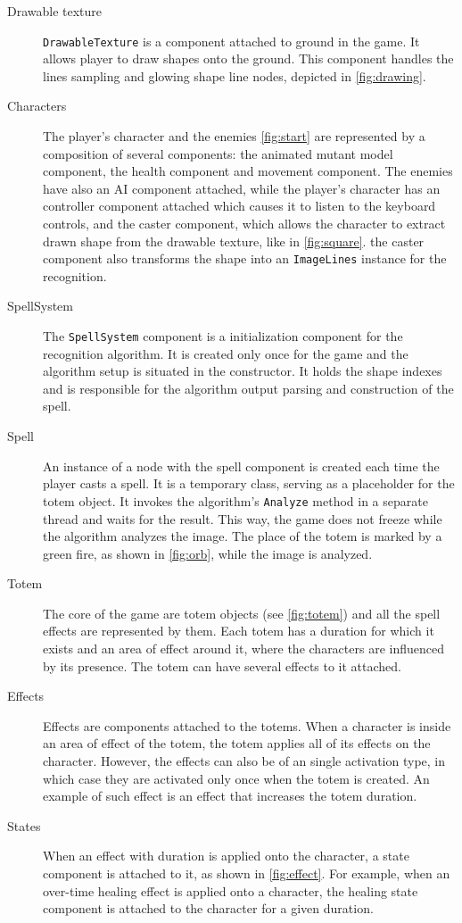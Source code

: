 \begin{description}
\item [Drawable texture] \texttt{DrawableTexture} is a component attached to ground in the game. It allows player to draw shapes onto the ground. This component handles the lines sampling and glowing shape line nodes, depicted in \cref{fig:drawing}.

\item [Characters] The player's character and the enemies \ref{fig:start} are represented by a composition of several components: the animated mutant model component, the health component and movement component. The enemies have also an AI component attached, while the player's character has an controller component attached which causes it to listen to the keyboard controls, and the caster component, which allows the character to extract drawn shape from the drawable texture, like in \cref{fig:square}. the caster component also transforms the shape into an \texttt{ImageLines} instance for the recognition.

\item [SpellSystem] The \texttt{SpellSystem} component is a initialization component for the recognition algorithm. It is created only once for the game and the algorithm setup is situated in the constructor. It holds the shape indexes and is responsible for the algorithm output parsing and construction of the spell.

\item [Spell] An instance of a node with the spell component is created each time the player casts a spell. It is a temporary class, serving as a placeholder for the totem object. It invokes the algorithm's \texttt{Analyze} method in a separate thread and waits for the result. This way, the game does not freeze while the algorithm analyzes the image. The place of the totem is marked by a green fire, as shown in \cref{fig:orb}, while the image is analyzed.

\item [Totem] The core of the game are totem objects (see \cref{fig:totem}) and all the spell effects are represented by them. Each totem has a duration for which it exists and an area of effect around it, where the characters are influenced by its presence. The totem can have several effects to it attached. 

\item [Effects]  Effects are components attached to the totems. When a character is inside an area of effect of the totem, the totem applies all of its effects on the character. However, the effects can also be of an single activation type, in which case they are activated only once when the totem is created. An example of such effect is an effect that increases the totem duration.

\item [States] When an effect with duration is applied onto the character, a state component is attached to it, as shown in \cref{fig:effect}. For example, when an over-time healing effect is applied onto a character, the healing state component is attached to the character for a given duration.

\end{description}

